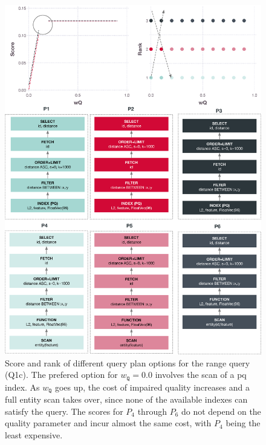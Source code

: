 \begin{figure}[p]
    \centering
    \includegraphics[width=\textwidth]{figures/analytics/analytics-cottontail-cost-range-annotated}
    \caption{Score and rank of different query plan options for the range query (Q1c). The prefered option for $w_{\texttt{Q}} = 0.0$ involves the scan of a \acrshort{pq} index. As $w_{\texttt{Q}}$ goes up, the cost of impaired quality increases and a full entity scan takes over, since none of the available indexes can satisfy the query. The scores for $P_4$ through $P_6$ do not depend on the quality parameter and incur almost the same cost, with $P_4$ being the least expensive.}
    \label{figure:cottontail_analytics_cost_range}
\end{figure}

